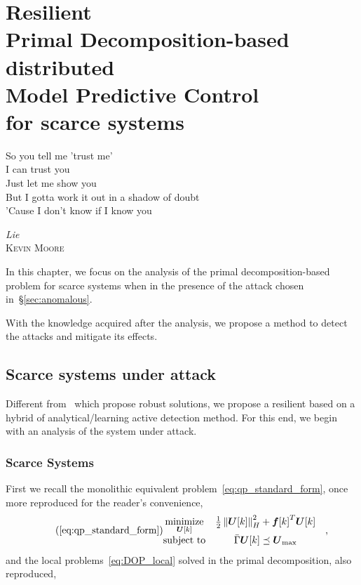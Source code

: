 \documentclass[../main.tex]{subfiles}
\begin{document}
\chapter[Resilient Primal Decomposition-based dMPC for scarce systems]{Resilient \\Primal Decomposition-based \\distributed \\Model Predictive Control\\ for scarce systems}\label{sec:safe_pddmpc_eq}
\epigraph{\centering So you tell me 'trust me' \\I can trust you\\ Just let me show you \\But I gotta work it out in a shadow of doubt \\'Cause I don't know if I know you}
{\textit{Lie}\\\textsc{Kevin Moore}}

In this chapter, we focus on the analysis of the primal decomposition-based \dmpc{} problem for scarce systems when in the presence of the attack chosen in~\S\ref{sec:anomalous}.

With the knowledge acquired after the analysis, we propose a method to detect the attacks and mitigate its effects.

\minitoc


\section{Scarce systems under attack}\label{sec:analys-scarce-syst}

Different from~\cite{VelardeEtAl2018,MaestreEtAl2021} which propose robust solutions, we propose a resilient \dmpc{} based on a hybrid of analytical/learning active detection method.
For this end, we begin with an analysis of the system under attack.

\subsection{Scarce Systems}\label{sec:scarce-systems}
First we recall the monolithic \mpc{} equivalent problem~\eqref{eq:qp_standard_form}, once more reproduced for the reader's convenience,
\begin{equation}
  \label{eq:qp_standard_form_again}
  \tag{\ref*{eq:qp_standard_form}}
  \begin{aligned}
    \begin{matrix}
      \minimize\limits_{\vec{U}[k]} &
                                                 \frac{1}{2}\norm{\vec{U}[k]}^{2}_{H} + {\vec{f}[k]}^{T}\vec{U}[k] &\\
      \mathrm{subject~ to} &
                             \bar{\Gamma}\vec{U}[k]\preceq {\vec{U}}_{\text{max}}
    \end{matrix}
  \end{aligned},
\end{equation}
and the local problems~\eqref{eq:DOP_local} solved in the primal decomposition, also reproduced,
\end{document}
